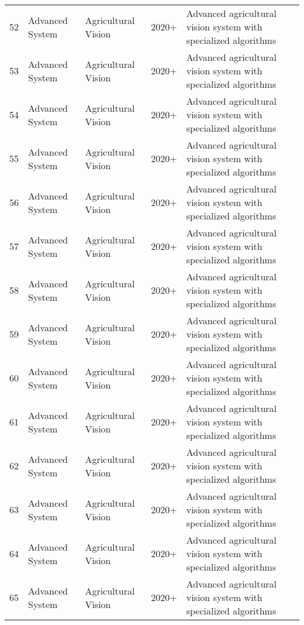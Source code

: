 \begin{table*}[htbp]
\begin{tabular}{p{}p{}p{}p{}p{}p{}}
 52 & Advanced System & Agricultural Vision & 2020+ & Advanced agricultural vision system with specialized algorithms & \cite{redmon2018yolov3} \\
 53 & Advanced System & Agricultural Vision & 2020+ & Advanced agricultural vision system with specialized algorithms & \cite{bochkovskiy2020yolov4} \\
 54 & Advanced System & Agricultural Vision & 2020+ & Advanced agricultural vision system with specialized algorithms & \cite{li2022yolov6} \\
 55 & Advanced System & Agricultural Vision & 2020+ & Advanced agricultural vision system with specialized algorithms & \cite{wang2023yolov7} \\
 56 & Advanced System & Agricultural Vision & 2020+ & Advanced agricultural vision system with specialized algorithms & \cite{yaseen2024yolov9} \\
 57 & Advanced System & Agricultural Vision & 2020+ & Advanced agricultural vision system with specialized algorithms & \cite{wang2024yolov10} \\
 58 & Advanced System & Agricultural Vision & 2020+ & Advanced agricultural vision system with specialized algorithms & \cite{khanam2410yolov11} \\
 59 & Advanced System & Agricultural Vision & 2020+ & Advanced agricultural vision system with specialized algorithms & \cite{xiong2021improved} \\
 60 & Advanced System & Agricultural Vision & 2020+ & Advanced agricultural vision system with specialized algorithms & \cite{gai2022fruit} \\
 61 & Advanced System & Agricultural Vision & 2020+ & Advanced agricultural vision system with specialized algorithms & \cite{abdulsalam2023fruity} \\
 62 & Advanced System & Agricultural Vision & 2020+ & Advanced agricultural vision system with specialized algorithms & \cite{zhang2023deep} \\
 63 & Advanced System & Agricultural Vision & 2020+ & Advanced agricultural vision system with specialized algorithms & \cite{ronneberger2015u} \\
 64 & Advanced System & Agricultural Vision & 2020+ & Advanced agricultural vision system with specialized algorithms & \cite{heschl2024synthset} \\
 65 & Advanced System & Agricultural Vision & 2020+ & Advanced agricultural vision system with specialized algorithms & \cite{ieee2024grape} \\

\end{tabular}
\end{table*}
